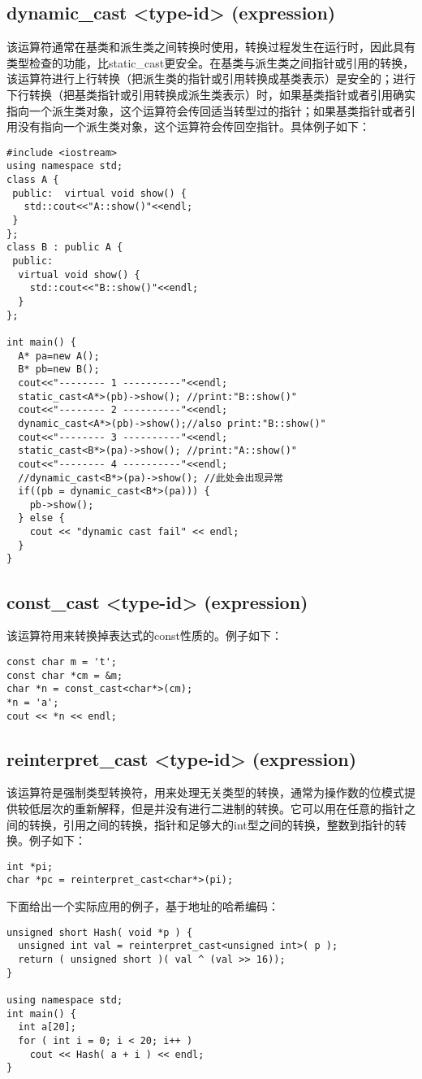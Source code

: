 \subsection{dynamic\_cast <type-id> (expression)}
该运算符通常在基类和派生类之间转换时使用，转换过程发生在运行时，因此具有类型检查的功能，比static\_cast更安全。在基类与派生类之间指针或引用的转换，该运算符进行上行转换（把派生类的指针或引用转换成基类表示）是安全的；进行下行转换（把基类指针或引用转换成派生类表示）时，如果基类指针或者引用确实指向一个派生类对象，这个运算符会传回适当转型过的指针；如果基类指针或者引用没有指向一个派生类对象，这个运算符会传回空指针。具体例子如下：
\begin{verbatim}
#include <iostream>  
using namespace std;  
class A {  
 public:  virtual void show() {  
   std::cout<<"A::show()"<<endl;  
 }  
};  
class B : public A {  
 public:
  virtual void show() {   
    std::cout<<"B::show()"<<endl;  
  }  
};  

int main() {  
  A* pa=new A();  
  B* pb=new B();  
  cout<<"-------- 1 ----------"<<endl;  
  static_cast<A*>(pb)->show(); //print:"B::show()"  
  cout<<"-------- 2 ----------"<<endl;  
  dynamic_cast<A*>(pb)->show();//also print:"B::show()"  
  cout<<"-------- 3 ----------"<<endl;  
  static_cast<B*>(pa)->show(); //print:"A::show()"   
  cout<<"-------- 4 ----------"<<endl;  
  //dynamic_cast<B*>(pa)->show(); //此处会出现异常  
  if((pb = dynamic_cast<B*>(pa))) {  
    pb->show();  
  } else {  
    cout << "dynamic cast fail" << endl;  
  }  
}  
\end{verbatim}
\subsection{const\_cast <type-id> (expression)}
该运算符用来转换掉表达式的const性质的。例子如下：
\begin{verbatim}
const char m = 't';  
const char *cm = &m;  
char *n = const_cast<char*>(cm);  
*n = 'a';  
cout << *n << endl; 
\end{verbatim}
\subsection{reinterpret\_cast <type-id> (expression)}
该运算符是强制类型转换符，用来处理无关类型的转换，通常为操作数的位模式提供较低层次的重新解释，但是并没有进行二进制的转换。它可以用在任意的指针之间的转换，引用之间的转换，指针和足够大的int型之间的转换，整数到指针的转换。例子如下：

\begin{verbatim}
int *pi;  
char *pc = reinterpret_cast<char*>(pi);
\end{verbatim}
下面给出一个实际应用的例子，基于地址的哈希编码：
\begin{verbatim}
unsigned short Hash( void *p ) {  
  unsigned int val = reinterpret_cast<unsigned int>( p );  
  return ( unsigned short )( val ^ (val >> 16));
}

using namespace std;  
int main() {  
  int a[20];  
  for ( int i = 0; i < 20; i++ )  
    cout << Hash( a + i ) << endl;  
}  
\end{verbatim}
